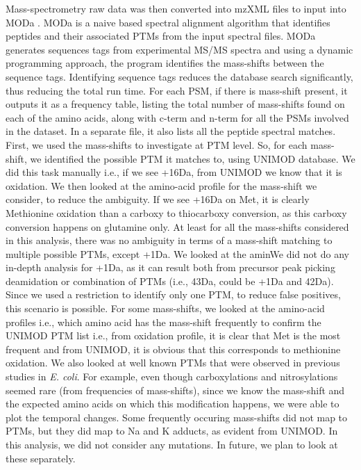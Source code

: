 \documentclass[12pt]{article}
\begin{document}
Mass-spectrometry raw data was then converted into mzXML files to input into MODa \cite{Naetal2012}. MODa is a naive based spectral alignment algorithm that identifies peptides and their associated PTMs from the input spectral files. MODa generates sequences tags from experimental MS/MS spectra and using a dynamic programming approach, the program identifies the  mass-shifts between the sequence tags. Identifying sequence tags reduces the database search significantly, thus reducing the total run time. For each PSM, if there is mass-shift present, it outputs it as a frequency table, listing the total number of mass-shifts found on each of the amino acids, along with c-term and n-term for all the PSMs involved in the dataset. In a separate file, it also lists all the peptide spectral matches. First, we used the mass-shifts to investigate at PTM level. So, for each mass-shift, we identified the possible PTM it matches to, using UNIMOD database. We did this task manually i.e., if we see +16Da, from UNIMOD we know that it is oxidation. We then looked at the amino-acid profile for the mass-shift we consider, to reduce the ambiguity. If we see +16Da on Met, it is clearly Methionine oxidation than a carboxy to thiocarboxy conversion, as this carboxy conversion happens on glutamine only. At least for all the mass-shifts considered in this analysis, there was no ambiguity in terms of a mass-shift matching to multiple possible PTMs, except +1Da. We looked at the aminWe did not do any in-depth analysis for +1Da, as it can result both from precursor peak picking deamidation or combination of PTMs (i.e., 43Da, could be +1Da and 42Da). Since we used a restriction to identify only one PTM, to reduce false positives, this scenario is possible. For some mass-shifts, we looked at the amino-acid profiles i.e., which amino acid has the mass-shift frequently to confirm the UNIMOD PTM list i.e., from oxidation profile, it is clear that Met is the  most frequent and from UNIMOD, it is obvious that this corresponds to methionine oxidation. We also looked at well known PTMs that were observed in previous studies in \emph{E. coli}. For example, even though carboxylations and nitrosylations seemed rare (from frequencies of mass-shifts), since we know the mass-shift and the expected amino acids on which this modification happens, we were able to plot the temporal changes. Some frequently occuring mass-shifts did not map to PTMs, but they did map to Na and K adducts, as evident from UNIMOD. In this analysis, we did not consider any mutations. In future, we plan to look at these separately.
\end{document}
